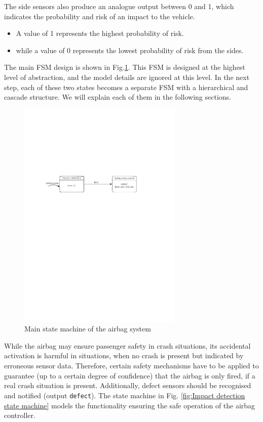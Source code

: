\documentclass[12pt	]{article}
\begin{document}
The side sensors also produce an analogue output between 0 and 1, which indicates the probability and risk of an impact to the vehicle.

\begin{itemize}
	\item A value of 1 represents the highest probability of risk.
	\item while a value of 0 represents the lowest probability of risk from the sides.
\end{itemize}

The main FSM design is shown in Fig.\ref{fig:Main state machine of the airbag system}. This FSM is designed at the highest level of abstraction, and the model details are ignored at this level. In the next step, each of these two states becomes a separate FSM with a hierarchical and cascade structure. We will explain each of them in the following sections.


\begin{figure}[h]
	\centering
	\includegraphics[width=0.7\textwidth]{Images/Ipe/FSM-top.pdf}
	\caption{Main state machine of the airbag system}
	\label{fig:Main state machine of the airbag system}
\end{figure}


While the airbag may ensure passenger safety in crash situations, its accidental activation is harmful in situations, when no crash is present but indicated by erroneous sensor data. Therefore, certain safety mechanisms have to be applied to guarantee (up to a certain degree of confidence) that the airbag is only fired, if a real crash situation is present. Additionally, defect sensors should be recognised and notified (output \texttt{defect}). The state machine in Fig. \ref{fig:Impact detection state machine} models the functionality ensuring the safe operation of the airbag controller.
\end{document}
